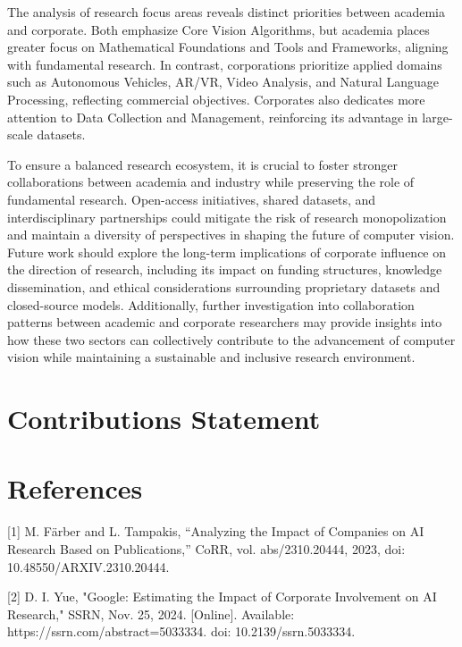 \documentclass{article}
\begin{document}
The analysis of research focus areas reveals distinct priorities between academia and corporate. Both emphasize Core Vision Algorithms, but academia places greater focus on Mathematical Foundations and Tools and Frameworks, aligning with fundamental research. In contrast, corporations prioritize applied domains such as Autonomous Vehicles, AR/VR, Video Analysis, and Natural Language Processing, reflecting commercial objectives. Corporates also dedicates more attention to Data Collection and Management, reinforcing its advantage in large-scale datasets.

To ensure a balanced research ecosystem, it is crucial to foster stronger collaborations between academia and industry while preserving the role of fundamental research. Open-access initiatives, shared datasets, and interdisciplinary partnerships could mitigate the risk of research monopolization and maintain a diversity of perspectives in shaping the future of computer vision. Future work should explore the long-term implications of corporate influence on the direction of research, including its impact on funding structures, knowledge dissemination, and ethical considerations surrounding proprietary datasets and closed-source models. Additionally, further investigation into collaboration patterns between academic and corporate researchers may provide insights into how these two sectors can collectively contribute to the advancement of computer vision while maintaining a sustainable and inclusive research environment.
\section{Contributions Statement}



\section*{References}

[1] M. Färber and L. Tampakis, “Analyzing the Impact of Companies on AI Research Based on Publications,” CoRR, vol. abs/2310.20444, 2023, doi: 10.48550/ARXIV.2310.20444.

[2] D. I. Yue, "Google: Estimating the Impact of Corporate Involvement on AI Research," SSRN, Nov. 25, 2024. [Online]. Available: https://ssrn.com/abstract=5033334. doi: 10.2139/ssrn.5033334.
\end{document}
